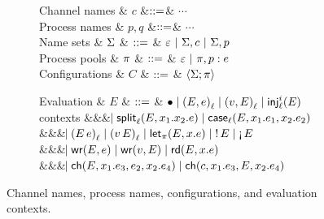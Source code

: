 \begin{figure*}[t]
\centering
\begin{subfigure}{0.35\textwidth}
\begin{grammar}
  Channel names & $c$   &$\bnfas$& $\cdots$
  \\
  Process names & $p,q$ &$\bnfas$& $\cdots$
  \\
  Name sets
  & $\Names$ 
    & $\bnfas$ & $\emptyNames ~|~ \Names, c ~|~ \Names, p$
  \\
  Process pools
  & $\Procs$ 
  & $\bnfas$ & $\emptyProcs ~|~ \Procs, \ProcNm{p} \proc{e}$
  \\
  Configurations
  & $C$
     & $\bnfas$ & $\Config{\Names}{}{\Procs} $
\end{grammar}
\end{subfigure}%
\begin{subfigure}{0.5\textwidth}
  \begin{grammar}
 Evaluation
  & $E$
 & $\bnfas$ &
$\bullet \bnfalt \ePair{E}{e}{\ell} \bnfalt \ePair{v}{E}{\ell} \bnfalt \eInjj{\ell}{i}{E}$ 
\\ contexts &&& $\bnfaltbrk \eSplitt{\ell}{E}{x_1}{x_2}{e} \bnfalt
\eCase{\ell}{E}{x_1}{e_1}{x_2}{e_2}$
\\ &&& $\bnfaltbrk \eApp{E}{e}{\ell} \bnfalt \eApp{v}{E}{\ell}  \bnfalt \eLet{x}{E}{e}
\bnfalt \eBang{E} \bnfalt \eUnbang{E}$
\\ &&& $\bnfaltbrk \eWr{E}{e} \bnfalt \eWr{v}{E} \bnfalt \eLetRd{E}{x}{e}$
\\ &&& $\bnfaltbrk \eChoicee{E}{x_1}{e_3}{e_2}{x_2}{e_4} \bnfalt \eChoicee{c}{x_1}{e_3}{E}{x_2}{e_4}$
\end{grammar}
\end{subfigure}
\caption{Channel names, process names, configurations, and evaluation contexts.}
\label{fig:configs}
\end{figure*}

